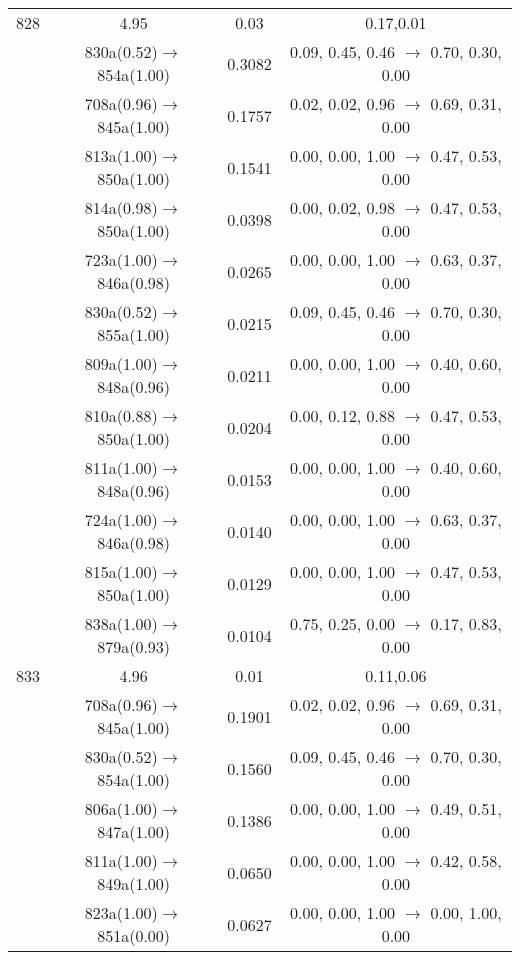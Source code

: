 \documentclass[10pt,a4paper]{article}
\begin{document}
\begin{longtable}{c|c|c|c}
 \hline828 &	 4.95 &	 0.03 &	 0.17,0.01 \\ 
  	& 830a(0.52)$\rightarrow$854a(1.00) &	 0.3082 &	 0.09, 0.45, 0.46 $\rightarrow$ 0.70, 0.30, 0.00 \\ 
 	& 708a(0.96)$\rightarrow$845a(1.00) &	 0.1757 &	 0.02, 0.02, 0.96 $\rightarrow$ 0.69, 0.31, 0.00 \\ 
 	& 813a(1.00)$\rightarrow$850a(1.00) &	 0.1541 &	 0.00, 0.00, 1.00 $\rightarrow$ 0.47, 0.53, 0.00 \\ 
 	& 814a(0.98)$\rightarrow$850a(1.00) &	 0.0398 &	 0.00, 0.02, 0.98 $\rightarrow$ 0.47, 0.53, 0.00 \\ 
 	& 723a(1.00)$\rightarrow$846a(0.98) &	 0.0265 &	 0.00, 0.00, 1.00 $\rightarrow$ 0.63, 0.37, 0.00 \\ 
 	& 830a(0.52)$\rightarrow$855a(1.00) &	 0.0215 &	 0.09, 0.45, 0.46 $\rightarrow$ 0.70, 0.30, 0.00 \\ 
 	& 809a(1.00)$\rightarrow$848a(0.96) &	 0.0211 &	 0.00, 0.00, 1.00 $\rightarrow$ 0.40, 0.60, 0.00 \\ 
 	& 810a(0.88)$\rightarrow$850a(1.00) &	 0.0204 &	 0.00, 0.12, 0.88 $\rightarrow$ 0.47, 0.53, 0.00 \\ 
 	& 811a(1.00)$\rightarrow$848a(0.96) &	 0.0153 &	 0.00, 0.00, 1.00 $\rightarrow$ 0.40, 0.60, 0.00 \\ 
 	& 724a(1.00)$\rightarrow$846a(0.98) &	 0.0140 &	 0.00, 0.00, 1.00 $\rightarrow$ 0.63, 0.37, 0.00 \\ 
 	& 815a(1.00)$\rightarrow$850a(1.00) &	 0.0129 &	 0.00, 0.00, 1.00 $\rightarrow$ 0.47, 0.53, 0.00 \\ 
 	& 838a(1.00)$\rightarrow$879a(0.93) &	 0.0104 &	 0.75, 0.25, 0.00 $\rightarrow$ 0.17, 0.83, 0.00 \\ 
 \hline833 &	 4.96 &	 0.01 &	 0.11,0.06 \\ 
  	& 708a(0.96)$\rightarrow$845a(1.00) &	 0.1901 &	 0.02, 0.02, 0.96 $\rightarrow$ 0.69, 0.31, 0.00 \\ 
 	& 830a(0.52)$\rightarrow$854a(1.00) &	 0.1560 &	 0.09, 0.45, 0.46 $\rightarrow$ 0.70, 0.30, 0.00 \\ 
 	& 806a(1.00)$\rightarrow$847a(1.00) &	 0.1386 &	 0.00, 0.00, 1.00 $\rightarrow$ 0.49, 0.51, 0.00 \\ 
 	& 811a(1.00)$\rightarrow$849a(1.00) &	 0.0650 &	 0.00, 0.00, 1.00 $\rightarrow$ 0.42, 0.58, 0.00 \\ 
 	& 823a(1.00)$\rightarrow$851a(0.00) &	 0.0627 &	 0.00, 0.00, 1.00 $\rightarrow$ 0.00, 1.00, 0.00 \\ 

\end{longtable}
\end{document}
